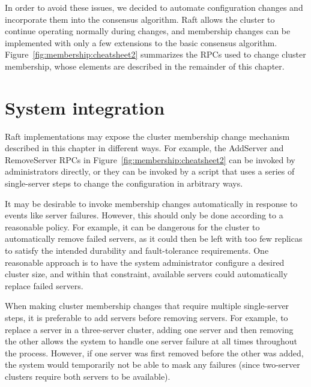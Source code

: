 In order to avoid these issues, we decided to automate configuration
changes and incorporate them into the \name{} consensus algorithm. Raft
allows the cluster to continue operating normally during changes, and
membership changes can be implemented with only a few extensions to the
basic consensus algorithm. Figure~\ref{fig:membership:cheatsheet2}
summarizes the RPCs used to change cluster membership, whose elements
are described in the remainder of this chapter.






\section{System integration}
\label{membership:system}

Raft implementations may expose the cluster membership change mechanism
described in this chapter in different ways. For example, the AddServer
and RemoveServer RPCs in Figure~\ref{fig:membership:cheatsheet2} can be
invoked by administrators directly, or they can be invoked by a script
that uses a series of single-server steps to change the configuration in
arbitrary ways.

It may be desirable to invoke membership changes automatically in
response to events like server failures. However, this should only be
done according to a reasonable policy. For example, it can be dangerous
for the cluster to automatically remove failed servers, as it could then
be left with too few replicas to satisfy the intended durability and
fault-tolerance requirements. One reasonable approach is to have the
system administrator configure a desired cluster size, and within that
constraint, available servers could automatically replace failed
servers.

When making cluster membership changes that require multiple
single-server steps, it is preferable to add servers before removing
servers. For example, to replace a server in a three-server cluster,
adding one server and then removing the other allows the system to
handle one server failure at all times throughout the process. However,
if one server was first removed before the other was added, the system
would temporarily not be able to mask any failures (since two-server
clusters require both servers to be available).

